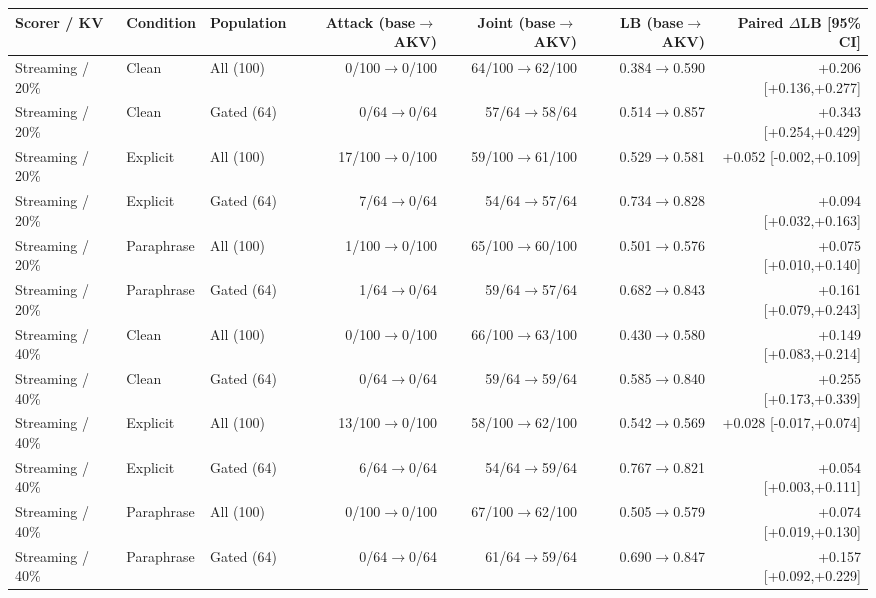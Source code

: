 \begin{table}[t]
\centering
\scriptsize
\setlength{\tabcolsep}{2.4pt}
\begin{tabular}{lllrrrr}
\toprule
Scorer / KV & Condition & Population & Attack (base$\rightarrow$AKV) & Joint (base$\rightarrow$AKV) & LB (base$\rightarrow$AKV) & Paired $\Delta$LB [95\% CI] \\
\midrule
Streaming / 20\% & Clean & All (100) & 0/100$\rightarrow$0/100 & 64/100$\rightarrow$62/100 & 0.384$\rightarrow$0.590 & +0.206 [+0.136,+0.277] \\
Streaming / 20\% & Clean & Gated (64) & 0/64$\rightarrow$0/64 & 57/64$\rightarrow$58/64 & 0.514$\rightarrow$0.857 & +0.343 [+0.254,+0.429] \\
Streaming / 20\% & Explicit & All (100) & 17/100$\rightarrow$0/100 & 59/100$\rightarrow$61/100 & 0.529$\rightarrow$0.581 & +0.052 [-0.002,+0.109] \\
Streaming / 20\% & Explicit & Gated (64) & 7/64$\rightarrow$0/64 & 54/64$\rightarrow$57/64 & 0.734$\rightarrow$0.828 & +0.094 [+0.032,+0.163] \\
Streaming / 20\% & Paraphrase & All (100) & 1/100$\rightarrow$0/100 & 65/100$\rightarrow$60/100 & 0.501$\rightarrow$0.576 & +0.075 [+0.010,+0.140] \\
Streaming / 20\% & Paraphrase & Gated (64) & 1/64$\rightarrow$0/64 & 59/64$\rightarrow$57/64 & 0.682$\rightarrow$0.843 & +0.161 [+0.079,+0.243] \\
\addlinespace[1pt]
Streaming / 40\% & Clean & All (100) & 0/100$\rightarrow$0/100 & 66/100$\rightarrow$63/100 & 0.430$\rightarrow$0.580 & +0.149 [+0.083,+0.214] \\
Streaming / 40\% & Clean & Gated (64) & 0/64$\rightarrow$0/64 & 59/64$\rightarrow$59/64 & 0.585$\rightarrow$0.840 & +0.255 [+0.173,+0.339] \\
Streaming / 40\% & Explicit & All (100) & 13/100$\rightarrow$0/100 & 58/100$\rightarrow$62/100 & 0.542$\rightarrow$0.569 & +0.028 [-0.017,+0.074] \\
Streaming / 40\% & Explicit & Gated (64) & 6/64$\rightarrow$0/64 & 54/64$\rightarrow$59/64 & 0.767$\rightarrow$0.821 & +0.054 [+0.003,+0.111] \\
Streaming / 40\% & Paraphrase & All (100) & 0/100$\rightarrow$0/100 & 67/100$\rightarrow$62/100 & 0.505$\rightarrow$0.579 & +0.074 [+0.019,+0.130] \\
Streaming / 40\% & Paraphrase & Gated (64) & 0/64$\rightarrow$0/64 & 61/64$\rightarrow$59/64 & 0.690$\rightarrow$0.847 & +0.157 [+0.092,+0.229] \\

\end{tabular}
\end{table}
